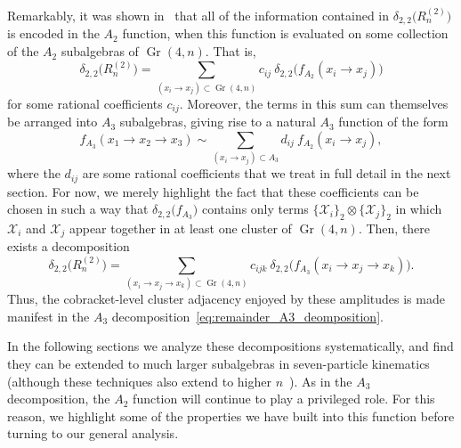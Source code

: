 \documentclass[11pt]{article}
\DeclareMathOperator{\Gr}{Gr}
\def\x{\mathcal{X}}
\begin{document}
Remarkably, it was shown in~\cite{Golden:2014xqa} that all of the information contained in $\delta_{2,2}\big(R^{(2)}_n\big)$ is encoded in the $A_2$ function, when this function is evaluated on some collection of the $A_2$ subalgebras of $\Gr(4,n)$. That is,
\begin{equation}
\delta_{2,2}\big( R_n^{(2)} \big) = \sum_{(x_i\to x_j) \subset \Gr(4,n)} c_{ij}\ \delta_{2,2} \big(f_{A_2}(x_i \to x_j)\big)
\end{equation}
for some rational coefficients $c_{ij}$. Moreover, the terms in this sum can themselves be arranged into $A_3$ subalgebras, giving rise to a natural $A_3$ function of the form
\begin{equation} \label{eq:a3_func_tilde}
f_{A_3}(x_1 \to x_2 \to x_3) \sim \sum_{(x_i\to x_j) \subset A_3} d_{ij}\ f_{A_2}(x_i \to x_j),
\end{equation}
where the $d_{ij}$ are some rational coefficients that we treat in full detail in the next section. For now, we merely highlight the fact that these coefficients can be chosen in such a way that $\delta_{2,2}\big(f_{A_3} \big)$ contains only terms $\{\x_i\}_2 \otimes \{\x_j \}_2$ in which $\x_i$ and $\x_j$ appear together in at least one cluster of $\Gr(4,n)$. Then, there exists a decomposition
\begin{equation} \label{eq:remainder_A3_deomposition}
\delta_{2,2}\big( R_n^{(2)} \big) = \sum_{(x_i\to x_j \to x_k) \subset \Gr(4,n)} c_{ijk}\ \delta_{2,2} \big(f_{A_3}(x_i \to x_j \to x_k)\big).
\end{equation}
Thus, the cobracket-level cluster adjacency enjoyed by these amplitudes is made manifest in the $A_3$ decomposition~\eqref{eq:remainder_A3_deomposition}.

In the following sections we analyze these decompositions systematically, and find they can be extended to much larger subalgebras in seven-particle kinematics (although these techniques also extend to higher $n$~\cite{cluster_subalgebras_ii}). As in the $A_3$ decomposition, the $A_2$ function will continue to play a privileged role. For this reason, we highlight some of the properties we have built into this function before turning to our general analysis. 
\end{document}

